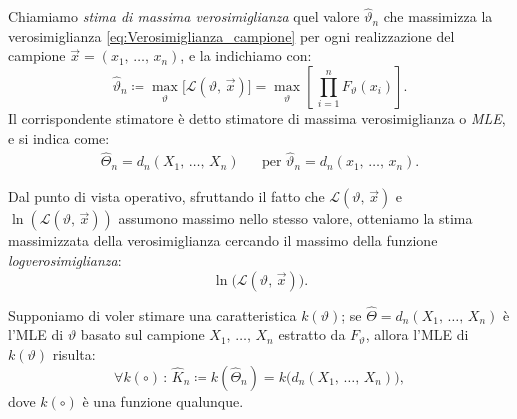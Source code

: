         \begin{defn}[MLE]
            Chiamiamo \emph{stima di massima verosimiglianza} quel valore $\hat{\vartheta}_n$ 
            che massimizza la verosimiglianza \eqref{eq:Verosimiglianza_campione} per ogni realizzazione 
            del campione $\vec{x} = (x_1,\, \ldots,\, x_{n})$, e la indichiamo con:
            \begin{equation}\label{eq:Stima_massima_verosimiglianza}
                \hat{\vartheta}_n \coloneqq \max_{\substack{\vartheta}} \big[\mathcal{L}(\vartheta,\, \vec{x})\big] =
                \max_{\substack{\vartheta}} \left[\,\prod_{i=1}^{n} F_\vartheta(x_i)\right]
            .\end{equation}
            Il corrispondente stimatore è detto stimatore di massima verosimiglianza o \emph{MLE}, e si 
            indica come:
            \begin{align}\label{eq:MLE}
                \hat{\Theta}_n = d_n(X_1,\, \ldots,\, X_{n})
                & & \text{per } \hat{\vartheta}_n = d_n(x_1,\, \ldots,\, x_{n})
            .\end{align}
        \end{defn}
        \begin{obsv}
            Dal punto di vista operativo, sfruttando il fatto che $\mathcal{L}(\vartheta,\,\vec{x})$ e 
            $\ln(\mathcal{L}(\vartheta,\,\vec{x}))$ assumono massimo nello stesso valore, 
            otteniamo la stima massimizzata della verosimiglianza cercando il massimo della funzione 
            \emph{log\nbdash verosimiglianza}: \[
                \ln \big(\mathcal{L}(\vartheta,\, \vec{x})\big)
            .\]
        \end{obsv}
        \begin{prty}
            Supponiamo di voler stimare una caratteristica $k(\vartheta)$; se 
            $\hat{\Theta} = d_n(X_1,\, \ldots,\, X_{n})$ è l'MLE di $\vartheta$ basato sul campione 
            $X_1,\, \ldots,\, X_{n}$ estratto da $F_\vartheta$, allora l'MLE di $k(\vartheta)$ risulta: \[
                \forall k(\circ) \,:\, \hat{K}_n \coloneqq k(\hat{\Theta}_n) = 
                k\big(d_n(X_1,\, \ldots,\, X_{n})\big)
            ,\] dove $k(\circ)$ è una funzione qualunque.
        \end{prty}
